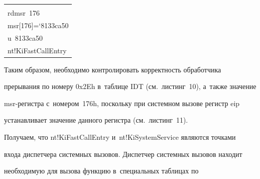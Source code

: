 \begin{table}
\begin{minipage}[b]{60mm}
\begin{center}
\begin{tabular}{|l|}
  \hline


  \\[-9pt]


{\sf rdmsr\ 176}\\


{\sf msr[176]\;=\;00000000`8133ca50}\\


{\sf u\ 8133ca50}\\


{\sf nt!KiFastCallEntry}\\


\hline


\end{tabular}






 \end{center}


 \end{minipage}


 \vspace*{-6pt}


\end{table}














  Таким образом, необходимо контролировать корректность обработчика 


прерывания по номеру {\sf 0x2Eh} в~таблице {\sf IDT} (см.\ листинг~10), а~также значение 


{\sf msr}-ре\-гист\-ра с~номером~{\sf 176h}, поскольку при системном вызове регистр {\sf eip} 


устанавливает значение данного регистра (см.\ листинг~11).


  





  Получаем, что {\sf nt!KiFastCallEntry} и~{\sf nt!KiSystemService} являются точками 


входа диспетчера системных вызовов. Диспетчер системных вызовов находит 


необходимую для вызова функцию в~специальных таблицах по 


